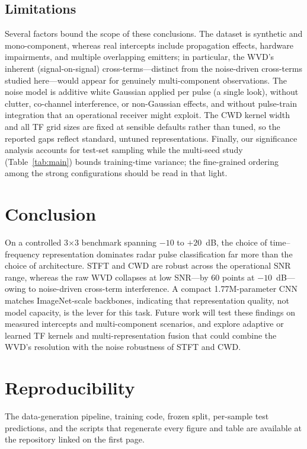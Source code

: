 \documentclass[journal]{IEEEtran}
\begin{document}
\subsection{Limitations}
Several factors bound the scope of these conclusions. The dataset is synthetic and
mono-component, whereas real intercepts include propagation effects, hardware
impairments, and multiple overlapping emitters; in particular, the WVD's inherent
(signal-on-signal) cross-terms---distinct from the noise-driven cross-terms studied
here---would appear for genuinely multi-component observations. The noise model is
additive white Gaussian applied per pulse (a single look), without clutter,
co-channel interference, or non-Gaussian effects, and without pulse-train
integration that an operational receiver might exploit. The CWD kernel width and
all TF grid sizes are fixed at sensible defaults rather than tuned, so the reported
gaps reflect standard, untuned representations. Finally, our significance analysis
accounts for test-set sampling while the multi-seed study (Table~\ref{tab:main})
bounds training-time variance; the fine-grained ordering among the strong
configurations should be read in that light.

\section{Conclusion}
On a controlled 3$\times$3 benchmark spanning $-10$ to $+20$~dB, the choice of
time--frequency representation dominates radar pulse classification far more than
the choice of architecture. STFT and CWD are robust across the operational SNR
range, whereas the raw WVD collapses at low SNR---by 60 points at $-10$~dB---owing
to noise-driven cross-term interference. A compact 1.77M-parameter CNN matches
ImageNet-scale backbones, indicating that representation quality, not model
capacity, is the lever for this task. Future work will test these findings on
measured intercepts and multi-component scenarios, and explore adaptive or learned
TF kernels and multi-representation fusion that could combine the WVD's resolution
with the noise robustness of STFT and CWD.

\section*{Reproducibility}
The data-generation pipeline, training code, frozen split, per-sample test
predictions, and the scripts that regenerate every figure and table are available
at the repository linked on the first page.



\end{document}

